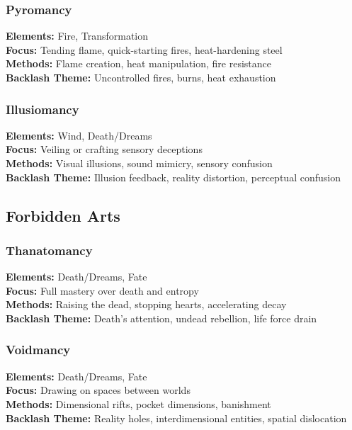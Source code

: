\documentclass[11pt]{report}
\begin{document}
\subsubsection{Pyromancy}
\textbf{Elements:} Fire, Transformation\\
\textbf{Focus:} Tending flame, quick-starting fires, heat-hardening steel\\
\textbf{Methods:} Flame creation, heat manipulation, fire resistance\\
\textbf{Backlash Theme:} Uncontrolled fires, burns, heat exhaustion

\subsubsection{Illusiomancy}
\textbf{Elements:} Wind, Death/Dreams\\
\textbf{Focus:} Veiling or crafting sensory deceptions\\
\textbf{Methods:} Visual illusions, sound mimicry, sensory confusion\\
\textbf{Backlash Theme:} Illusion feedback, reality distortion, perceptual confusion

\subsection{Forbidden Arts}

\subsubsection{Thanatomancy}
\textbf{Elements:} Death/Dreams, Fate\\
\textbf{Focus:} Full mastery over death and entropy\\
\textbf{Methods:} Raising the dead, stopping hearts, accelerating decay\\
\textbf{Backlash Theme:} Death's attention, undead rebellion, life force drain

\subsubsection{Voidmancy}
\textbf{Elements:} Death/Dreams, Fate\\
\textbf{Focus:} Drawing on spaces between worlds\\
\textbf{Methods:} Dimensional rifts, pocket dimensions, banishment\\
\textbf{Backlash Theme:} Reality holes, interdimensional entities, spatial dislocation
\end{document}
